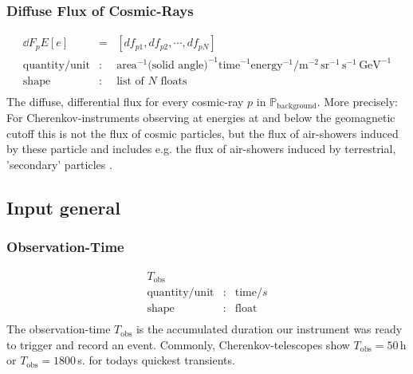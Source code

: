 \documentclass{article}%
\begin{document}
            \subsubsection*{Diffuse Flux of Cosmic-Rays}
                \begin{eqnarray*}
                    \dd{F_p}{E}[e] &=& [df_{p1}, df_{p2}, \cdots, df_{pN}]\\
                    \text{quantity}/\text{unit} &:& \text{area}^{-1} \text{(solid angle)}^{-1} \text{time}^{-1} \text{energy}^{-1} / \text{m}^{-2}\, \text{sr}^{-1}\,\text{s}^{-1}\,\text{GeV}^{-1}\\
                    \text{shape} &:& \text{list of}\,\,N\,\,\text{floats}\\
                \end{eqnarray*}
                The diffuse, differential flux for every cosmic-ray $p$ in $\mathbb{P}_\text{background}$.
                More precisely: For Cherenkov-instruments observing at energies at and below the geomagnetic cutoff this is not the flux of cosmic particles, but the flux of air-showers induced by these particle and includes e.g. the flux of air-showers induced by terrestrial, 'secondary' particles \cite{lipari2002fluxes}.
        \subsection{Input general}
            \subsubsection*{Observation-Time}
                \begin{eqnarray*}
                    T_\text{obs} && \\
                    \text{quantity}/\text{unit} &:& \text{time} / s\\
                    \text{shape} &:& \text{float}\\
                \end{eqnarray*}
                The observation-time $T_\text{obs}$ is the accumulated duration our instrument was ready to trigger and record an event.
                Commonly, Cherenkov-telescopes show $T_\text{obs} = 50\,$h or $T_\text{obs} = 1800\,$s. for todays quickest transients.
\end{document}
